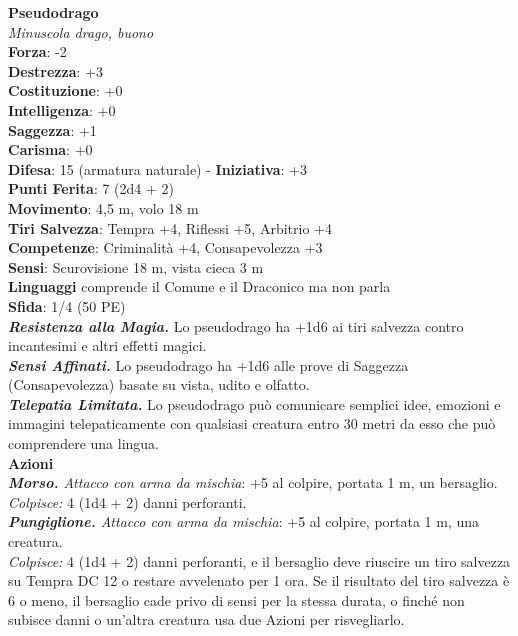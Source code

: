 \begin{multicols}{2}
\medskip\textbf{Pseudodrago}\\
\emph{Minuscola drago, buono}\\
\textbf{Forza}: -2\\
\textbf{Destrezza}: +3\\
\textbf{Costituzione}: +0\\
\textbf{Intelligenza}: +0\\
\textbf{Saggezza}: +1\\
\textbf{Carisma}: +0\\
\textbf{Difesa}: 15 (armatura naturale) - \textbf{Iniziativa}: +3\\
\textbf{Punti Ferita}: 7 (2d4 + 2)\\
\textbf{Movimento}: 4,5 m, volo 18 m\\
\textbf{Tiri Salvezza}: Tempra +4, Riflessi +5, Arbitrio +4\\
\textbf{Competenze}: Criminalità +4, Consapevolezza +3\\
\textbf{Sensi}: Scurovisione 18 m, vista cieca 3 m\\
\textbf{Linguaggi} comprende il Comune e il Draconico ma non parla\\
\textbf{Sfida}: 1/4 (50 PE)\smallskip\\
\emph{\textbf{Resistenza alla Magia.}} Lo pseudodrago ha +1d6 ai tiri salvezza contro incantesimi e altri effetti magici.\\
\emph{\textbf{Sensi Affinati.}} Lo pseudodrago ha +1d6 alle prove di Saggezza (Consapevolezza) basate su vista, udito e olfatto.\\
\emph{\textbf{Telepatia Limitata.}} Lo pseudodrago può comunicare semplici idee, emozioni e immagini telepaticamente con qualsiasi creatura entro 30 metri da esso che può comprendere una lingua. \\
\smallskip\textbf{Azioni}\\
\emph{\textbf{Morso.} Attacco con arma da mischia}: +5 al colpire, portata 1 m, un bersaglio.\\
\emph{Colpisce:} 4 (1d4 + 2) danni perforanti.\\
\emph{\textbf{Pungiglione.} Attacco con arma da mischia}: +5 al colpire, portata 1 m, una creatura.\\
\emph{Colpisce:} 4 (1d4 + 2) danni perforanti, e il bersaglio deve riuscire un tiro salvezza su Tempra DC  12 o restare avvelenato per 1 ora. Se il risultato del tiro salvezza è 6 o meno, il bersaglio cade privo di sensi per la stessa durata, o finché non subisce danni o un'altra creatura usa due Azioni per risvegliarlo.\\

\end{multicols}
